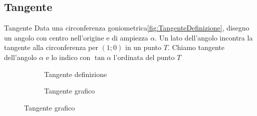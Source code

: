\subsection{Tangente}
\begin{definizionet}{Tangente}{}
	Data una circonferenza goniometrica\nobs\vref{fig:TangenteDefinizione}, disegno un angolo con centro nell'origine e di ampiezza $\alpha$. Un lato dell'angolo incontra la tangente  alla circonferenza  per $(1;0)$ in un punto $T$.  Chiamo tangente dell'angolo $\alpha$ e lo indico con $\tan\alpha$ l'ordinata  del punto $T$
\end{definizionet}
\label{sec:Tangente}
\begin{figure}
	\begin{subfigure}[b]{.5\linewidth}
		\centering
			
		\caption{Tangente definizione}\label{fig:TangenteDefinizione}
	\end{subfigure}%
	\begin{subfigure}[b]{.5\linewidth}
		\centering
		\caption{Tangente grafico}\label{fig:TangenteGrafico}
	\end{subfigure}
	\label{tab:funztg}
\end{figure}
